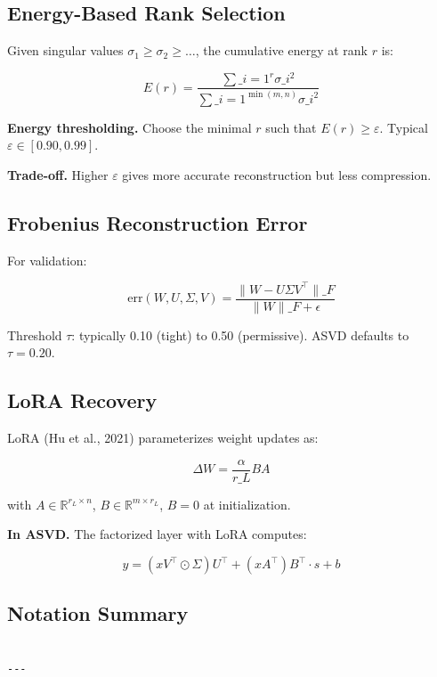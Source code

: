 \subsection{Energy-Based Rank Selection}

Given singular values $\sigma_1 \geq \sigma_2 \geq \dots$, the cumulative 
energy at rank $r$ is:

\[
E(r) = \frac{\sum\_{i=1}^r \sigma\_i^2}{\sum\_{i=1}^{\min(m, n)} \sigma\_i^2}
\]

\textbf{Energy thresholding.} Choose the minimal $r$ such that $E(r) \geq \varepsilon$. 
Typical $\varepsilon \in [0.90, 0.99]$.

\textbf{Trade-off.} Higher $\varepsilon$ gives more accurate reconstruction but 
less compression.

\subsection{Frobenius Reconstruction Error}

For validation:

\[
\text{err}(W, U, \Sigma, V) = \frac{\|W - U \Sigma V^\top\|\_F}{\|W\|\_F + \epsilon}
\]

Threshold $\tau$: typically 0.10 (tight) to 0.50 (permissive). ASVD 
defaults to $\tau = 0.20$.

\subsection{LoRA Recovery}

LoRA (Hu et al., 2021) parameterizes weight updates as:

\[
\Delta W = \frac{\alpha}{r\_L} B A
\]

with $A \in \mathbb{R}^{r_L \times n}$, $B \in \mathbb{R}^{m \times r_L}$, 
$B = 0$ at initialization.

\textbf{In ASVD.} The factorized layer with LoRA computes:

\[
y = (x V^\top \odot \Sigma) U^\top + (x A^\top) B^\top \cdot s + b
\]

\subsection{Notation Summary}

\begin{lstlisting}

---
\end{lstlisting}